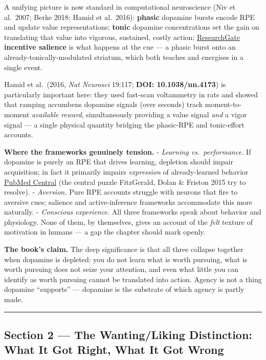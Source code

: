 A unifying picture is now standard in computational neuroscience (Niv et al.~2007; Berke 2018; Hamid et al.~2016): \textbf{phasic} dopamine bursts encode RPE and update value representations; \textbf{tonic} dopamine concentrations set the gain on translating that value into vigorous, sustained, costly action; \href{https://www.researchgate.net/publication/6762958_Tonic_dopamine_Opportunity_costs_and_the_control_of_response_vigor}{ResearchGate} \textbf{incentive salience} is what happens at the cue --- a phasic burst onto an already-tonically-modulated striatum, which both teaches and energises in a single event.

Hamid et al.~(2016, \emph{Nat Neurosci} 19:117; \textbf{DOI: 10.1038/nn.4173}) is particularly important here: they used fast-scan voltammetry in rats and showed that ramping accumbens dopamine signals (over seconds) track moment-to-moment \emph{available reward}, simultaneously providing a value signal \emph{and} a vigor signal --- a single physical quantity bridging the phasic-RPE and tonic-effort accounts.

\textbf{Where the frameworks genuinely tension.} - \emph{Learning vs.~performance.} If dopamine is purely an RPE that drives learning, depletion should impair acquisition; in fact it primarily impairs \emph{expression} of already-learned behavior \href{https://pmc.ncbi.nlm.nih.gov/articles/PMC2991243/}{PubMed Central} (the central puzzle FitzGerald, Dolan \& Friston 2015 try to resolve). - \emph{Aversion.} Pure RPE accounts struggle with neurons that fire to aversive cues; salience and active-inference frameworks accommodate this more naturally. - \emph{Conscious experience.} All three frameworks speak about behavior and physiology. None of them, by themselves, gives an account of the \emph{felt} texture of motivation in humans --- a gap the chapter should mark openly.

\textbf{The book's claim.} The deep significance is that all three collapse together when dopamine is depleted: you do not learn what is worth pursuing, what is worth pursuing does not seize your attention, and even what little you can identify as worth pursuing cannot be translated into action. Agency is not a thing dopamine ``supports'' --- dopamine is the substrate of which agency is partly made.

\begin{center}\rule{0.5\linewidth}{0.5pt}\end{center}

\subsection{Section 2 --- The Wanting/Liking Distinction: What It Got Right, What It Got Wrong}\label{01_dopamine_substrate-section-2-the-wantingliking-distinction-what-it-got-right-what-it-got-wrong}

